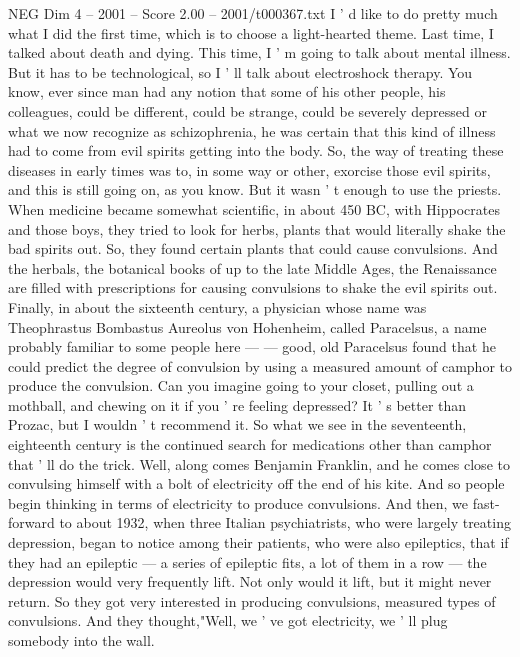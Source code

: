 \begin{textsample}{NEG Dim 4 – 2001 – Score 2.00 – 2001/t000367.txt}  \label{ex:f4_neg_004}
I ' d like to do pretty much what I did the first time, which is to choose a light-hearted theme.
Last time, I talked about death and dying.
This time, I ' m going to talk about mental illness.
But it has to be technological, so I ' ll talk about electroshock therapy.
You know, ever since man had any notion that some of his other people, his colleagues, could be different, could be strange, could be severely depressed or what we now recognize as schizophrenia, he was certain that this kind of illness had to come from evil spirits getting into the body.
So, the way of treating these diseases in early times was to, in some way or other, exorcise those evil spirits, and this is still going on, as you know.
But it wasn ' t enough to use the priests.
When medicine became somewhat scientific, in about 450 BC, with Hippocrates and those boys, they tried to look for herbs, plants that would literally shake the bad spirits out.
So, they found certain plants that could cause convulsions.
And the herbals, the botanical books of up to the late Middle Ages, the Renaissance are filled with prescriptions for causing convulsions to shake the evil spirits out.
Finally, in about the sixteenth century, a physician whose name was Theophrastus Bombastus Aureolus von Hohenheim, called Paracelsus, a name probably familiar to some people here — — good, old Paracelsus found that he could predict the degree of convulsion by using a measured amount of camphor to produce the convulsion.
Can you imagine going to your closet, pulling out a mothball, and chewing on it if you ' re feeling depressed?
It ' s better than Prozac, but I wouldn ' t recommend it.
So what we see in the seventeenth, eighteenth century is the continued search for medications other than camphor that ' ll do the trick.
Well, along comes Benjamin Franklin, and he comes close to convulsing himself with a bolt of electricity off the end of his kite.
And so people begin thinking in terms of electricity to produce convulsions.
And then, we fast-forward to about 1932, when three Italian psychiatrists, who were largely treating depression, began to notice among their patients, who were also epileptics, that if they had an epileptic — a series of epileptic fits, a lot of them in a row — the depression would very frequently lift.
Not only would it lift, but it might never return.
So they got very interested in producing convulsions, measured types of convulsions.
And they thought,"Well, we ' ve got electricity, we ' ll plug somebody into the wall.

\end{textsample}
